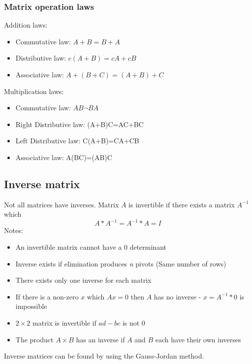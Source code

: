 \documentclass[10pt,a4paper]{article}
\begin{document}
\subsubsection{Matrix operation laws}
Addition laws:
\begin{itemize}
	\item Commutative law: $A+B=B+A$
	\item Distributive law: $c(A+B)=cA+cB$
	\item Associative law: $A+(B+C)=(A+B)+C$
\end{itemize}
Multiplication laws:
\begin{itemize}
	\item Commutative law: $AB\neg BA$
	\item Right Distributive law: (A+B)C=AC+BC
	\item Left Distributive law: C(A+B)=CA+CB
	\item Associative law: A(BC)=(AB)C 
\end{itemize}
\vfill
\pagebreak
\subsection{Inverse matrix}
Not all matrices have inverses. Matrix $A$ is invertible if there exists a matrix $A^{-1}$ which
$$A*A^{-1}=A^{-1}*A=I$$
Notes:
\begin{itemize}
	\item An invertible matrix cannot have a 0 determinant
	\item Inverse exists if elimination produces \textit{n} pivots (Same number of rows)
	\item There exists only one inverse for each matrix
	\item If there is a non-zero $x$ which $Ax=0$ then $A$ has no inverse - $x=A^{-1}*0$ is impossible
	\item $2\times 2$ matrix is invertible if $ad-bc$ is not 0
	\item The product $A\times B$ has an inverse if $A$ and $B$ each have their own inverses
\end{itemize}
Inverse matrices can be found by using the Gauss-Jordan method.
\end{document}
